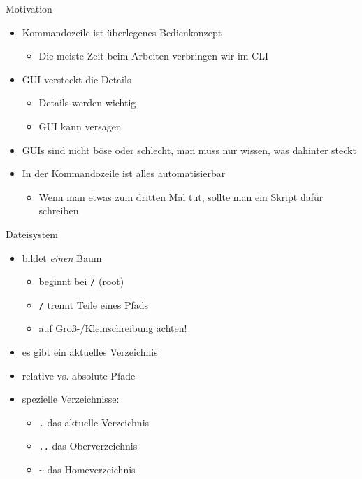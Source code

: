 \begin{frame}{Motivation}
  \begin{itemize}
    \item Kommandozeile ist überlegenes Bedienkonzept
      \begin{itemize}
        \item Die meiste Zeit beim Arbeiten verbringen wir im CLI
      \end{itemize}
    \item GUI versteckt die Details
      \begin{itemize}
        \item Details werden wichtig
        \item GUI kann versagen
      \end{itemize}
    \item GUIs sind nicht böse oder schlecht, man muss nur wissen, was dahinter steckt
    \item In der Kommandozeile ist alles automatisierbar
      \begin{itemize}
        \item Wenn man etwas zum dritten Mal tut, sollte man ein Skript dafür schreiben
      \end{itemize}
  \end{itemize}
\end{frame}

\begin{frame}{Dateisystem}
  \begin{itemize}
    \item bildet \emph{einen} Baum
      \begin{itemize}
        \item beginnt bei \texttt{/} (root)
        \item \texttt{/} trennt Teile eines Pfads
        \item auf Groß-/Kleinschreibung achten!
      \end{itemize}
    \item es gibt ein aktuelles Verzeichnis
    \item relative vs. absolute Pfade
    \item spezielle Verzeichnisse:
      \begin{itemize}
        \item \texttt{.} das aktuelle Verzeichnis
        \item \texttt{..} das Oberverzeichnis
        \item \texttt{\textasciitilde} das Homeverzeichnis
      \end{itemize}
  \end{itemize}
\end{frame}

